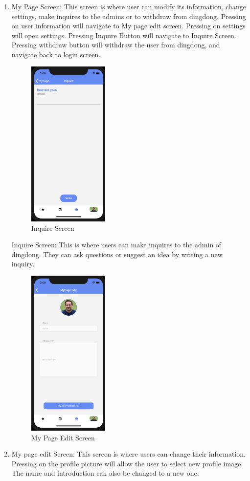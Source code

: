\documentclass[conference]{IEEEtran}
\begin{document}
\begin{enumerate}
    \item My Page Screen: This screen is where user can modify its information, change settings, make inquires to the admins or to withdraw from dingdong. Pressing on user information will navigate to My page edit screen. Pressing on settings will open settings. Pressing Inquire Button will navigate to Inquire Screen. Pressing withdraw button will withdraw the user from dingdong, and navigate back to login screen.
     \begin{figure}[h]
        \centering
        \includegraphics[width=4cm]{images/inquire.png}
        \caption{Inquire Screen}
        \label{fig:my_label}
    \end{figure}
    \iten Inquire Screen: This is where users can make inquires to the admin of dingdong. They can ask questions or suggest an idea by writing a new inquiry.
    \begin{figure}[h]
        \centering
        \includegraphics[width=4cm]{images/mypageedit.png}
        \caption{My Page Edit Screen}
        \label{fig:my_label}
    \end{figure}
    \item My page edit Screen: This screen is where users can change their information. Pressing on the profile picture will allow the user to select new profile image. The name and introduction can also be changed to a new one.
    
\end{enumerate}
\end{document}
